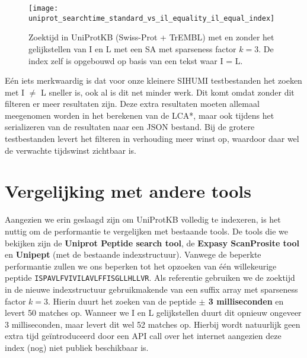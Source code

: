 \begin{figure}[ht]
    \centering
    \texttt{[image: uniprot\_searchtime\_standard\_vs\_il\_equality\_il\_equal\_index]}
    \caption{Zoektijd in UniProtKB (Swiss-Prot + TrEMBL) met en zonder het gelijkstellen van I en L met een SA met sparseness factor $k = 3$. De index zelf is opgebouwd op basis van een tekst waar I = L.}
    \label{fig:uniprot_search_il_equal}
\end{figure}

Eén iets merkwaardig is dat voor onze kleinere SIHUMI testbestanden het zoeken met I $\neq$ L sneller is, ook al is dit net minder werk.
Dit komt omdat zonder dit filteren er meer resultaten zijn.
Deze extra resultaten moeten allemaal meegenomen worden in het berekenen van de LCA*, maar ook tijdens het serializeren van de resultaten naar een JSON bestand.
Bij de grotere testbestanden levert het filteren in verhouding meer winst op, waardoor daar wel de verwachte tijdswinst zichtbaar is.

\section{Vergelijking met andere tools}\label{subsec:vergelijking-met-andere-tools}
Aangezien we erin geslaagd zijn om UniProtKB volledig te indexeren, is het nuttig om de performantie te vergelijken met bestaande tools.
De tools die we bekijken zijn de \textbf{Uniprot Peptide search tool}, de \textbf{Expasy ScanProsite tool} en \textbf{Unipept} (met de bestaande indexstructuur).
Vanwege de beperkte performantie zullen we ons beperken tot het opzoeken van één willekeurige peptide \texttt{ISPAVLFVIVILAVLFFISGLLHLLVR}.
Als referentie gebruiken we de zoektijd in de nieuwe indexstructuur gebruikmakende van een suffix array met sparseness factor $k = 3$.
Hierin duurt het zoeken van de peptide \textbf{$\pm$ 3 milliseconden} en levert 50 matches op.
Wanneer we I en L gelijkstellen duurt dit opnieuw ongeveer 3 milliseconden, maar levert dit wel 52 matches op.
Hierbij wordt natuurlijk geen extra tijd geïntroduceerd door een API call over het internet aangezien deze index (nog) niet publiek beschikbaar is.

